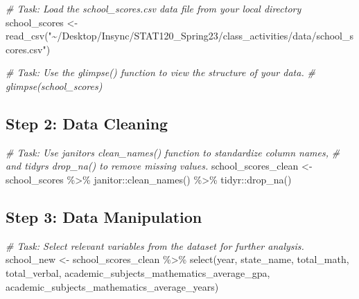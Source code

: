 \documentclass[
]{book}
\newenvironment{Shaded}{\begin{snugshade}}{\end{snugshade}}
\newcommand{\CommentTok}[1]{\textcolor[rgb]{0.56,0.35,0.01}{\textit{#1}}}
\newcommand{\FunctionTok}[1]{\textcolor[rgb]{0.00,0.00,0.00}{#1}}
\newcommand{\NormalTok}[1]{#1}
\newcommand{\OtherTok}[1]{\textcolor[rgb]{0.56,0.35,0.01}{#1}}
\newcommand{\SpecialCharTok}[1]{\textcolor[rgb]{0.00,0.00,0.00}{#1}}
\newcommand{\StringTok}[1]{\textcolor[rgb]{0.31,0.60,0.02}{#1}}
\begin{document}
\begin{Shaded}
\begin{Highlighting}[]
\CommentTok{\# Task: Load the school\_scores.csv data file from your local directory}
\NormalTok{school\_scores }\OtherTok{\textless{}{-}} \FunctionTok{read\_csv}\NormalTok{(}\StringTok{"\textasciitilde{}/Desktop/Insync/STAT120\_Spring23/class\_activities/data/school\_scores.csv"}\NormalTok{) }
\end{Highlighting}
\end{Shaded}

\begin{Shaded}
\begin{Highlighting}[]
\CommentTok{\# Task: Use the glimpse() function to view the structure of your data.}
\CommentTok{\# glimpse(school\_scores)}
\end{Highlighting}
\end{Shaded}

\hypertarget{step-2-data-cleaning}{%
\subsection{Step 2: Data Cleaning}\label{step-2-data-cleaning}}

\begin{Shaded}
\begin{Highlighting}[]
\CommentTok{\# Task: Use janitor\textquotesingle{}s clean\_names() function to standardize column names, }
\CommentTok{\# and tidyr\textquotesingle{}s drop\_na() to remove missing values.}
\NormalTok{school\_scores\_clean }\OtherTok{\textless{}{-}}\NormalTok{ school\_scores }\SpecialCharTok{\%\textgreater{}\%}
\NormalTok{  janitor}\SpecialCharTok{::}\FunctionTok{clean\_names}\NormalTok{() }\SpecialCharTok{\%\textgreater{}\%} 
\NormalTok{  tidyr}\SpecialCharTok{::}\FunctionTok{drop\_na}\NormalTok{()}
\end{Highlighting}
\end{Shaded}

\hypertarget{step-3-data-manipulation}{%
\subsection{Step 3: Data Manipulation}\label{step-3-data-manipulation}}

\begin{Shaded}
\begin{Highlighting}[]
\CommentTok{\# Task: Select relevant variables from the dataset for further analysis.}
\NormalTok{school\_new }\OtherTok{\textless{}{-}}\NormalTok{ school\_scores\_clean }\SpecialCharTok{\%\textgreater{}\%} \FunctionTok{select}\NormalTok{(year, }
\NormalTok{                                             state\_name, }
\NormalTok{                                             total\_math, }
\NormalTok{                                             total\_verbal, }
\NormalTok{                                             academic\_subjects\_mathematics\_average\_gpa, }
\NormalTok{                                             academic\_subjects\_mathematics\_average\_years)}
\end{Highlighting}
\end{Shaded}
\end{document}
